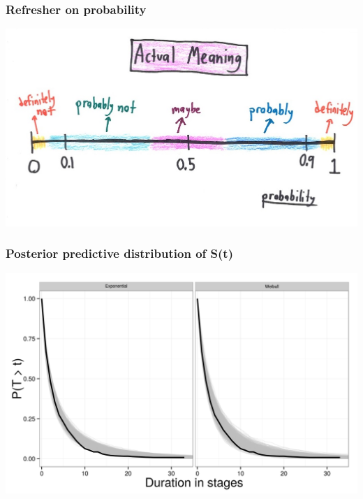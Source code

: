 \documentclass{beamer}
\begin{document}
\begin{frame}
  \frametitle{Refresher on probability}

  \includegraphics[width = \textwidth,height = 0.8\textheight,keepaspectratio = true]{figure/probability}

\end{frame}


\begin{frame}
  \frametitle{Posterior predictive distribution of S(t)}

  \begin{center}
    \includegraphics[width = \textwidth,height = 0.8\textheight,keepaspectratio = true]{figure/survival_curves}
  \end{center}
\end{frame}
\end{document}
